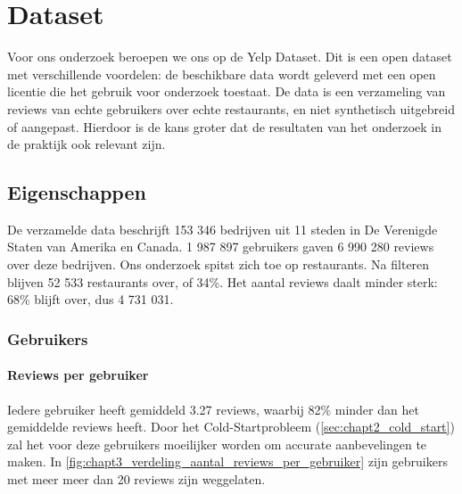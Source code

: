 \chapter{Dataset}

Voor ons onderzoek beroepen we ons op de Yelp Dataset. Dit is een open dataset met verschillende voordelen: de beschikbare data wordt geleverd met een open licentie die het gebruik voor onderzoek toestaat. \cite{Yelp_Dataset} De data is een verzameling van reviews van echte gebruikers over echte restaurants, en niet synthetisch uitgebreid of aangepast. Hierdoor is de kans groter dat de resultaten van het onderzoek in de praktijk ook relevant zijn.

\section{Eigenschappen}
De verzamelde data beschrijft 153 346 bedrijven uit 11 steden in De Verenigde Staten van Amerika en Canada. 1 987 897 gebruikers gaven 6 990 280 reviews over deze bedrijven. Ons onderzoek spitst zich toe op restaurants. Na filteren blijven 52 533 restaurants over, of 34\%. Het aantal reviews daalt minder sterk: 68\% blijft over, dus 4 731 031.

\subsection{Gebruikers}
\subsubsection{Reviews per gebruiker}
\label{sec:chapt3_reviews_per_gebruiker}
Iedere gebruiker heeft gemiddeld 3.27 reviews, waarbij 82\% minder dan het gemiddelde reviews heeft. Door het Cold-Startprobleem (\ref{sec:chapt2_cold_start}) zal het voor deze gebruikers moeilijker worden om accurate aanbevelingen te maken. In \autoref{fig:chapt3_verdeling_aantal_reviews_per_gebruiker} zijn gebruikers met meer meer dan 20 reviews zijn weggelaten.

